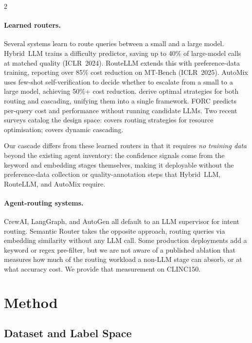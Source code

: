 \documentclass[11pt,a4paper]{article}
\begin{document}
\begin{multicols}{2}
\paragraph{Learned routers.}
Several systems learn to route queries between a small and a large model.
Hybrid~LLM \citep{ding2024hybridllm} trains a difficulty predictor, saving up to 40\% of large-model calls at matched quality (ICLR~2024). RouteLLM \citep{ong2025routellm} extends this with preference-data training, reporting over 85\% cost reduction on MT-Bench (ICLR~2025). AutoMix \citep{madaan2024automix} uses few-shot self-verification to decide whether to escalate from a small to a large model, achieving 50\%+ cost reduction. \citet{dekoninck2024unified} derive optimal strategies for both routing and cascading, unifying them into a single framework. FORC \citep{sakota2024forc} predicts per-query cost and performance without running candidate LLMs. Two recent surveys catalog the design space: \citet{survey2025routing} covers routing strategies for resource optimisation; \citet{survey2026dynamic} covers dynamic cascading.

Our cascade differs from these learned routers in that it requires \emph{no training data} beyond the existing agent inventory: the confidence signals come from the keyword and embedding stages themselves, making it deployable without the preference-data collection or quality-annotation steps that Hybrid~LLM, RouteLLM, and AutoMix require.

\paragraph{Agent-routing systems.}
CrewAI, LangGraph, and AutoGen all default to an LLM supervisor for intent routing. Semantic Router \citep{semanticrouter2024} takes the opposite approach, routing queries via embedding similarity without any LLM call. Some production deployments add a keyword or regex pre-filter, but we are not aware of a published ablation that measures how much of the routing workload a non-LLM stage can absorb, or at what accuracy cost. We provide that measurement on CLINC150.

\section{Method}

\subsection{Dataset and Label Space}


\end{multicols}
\end{document}
